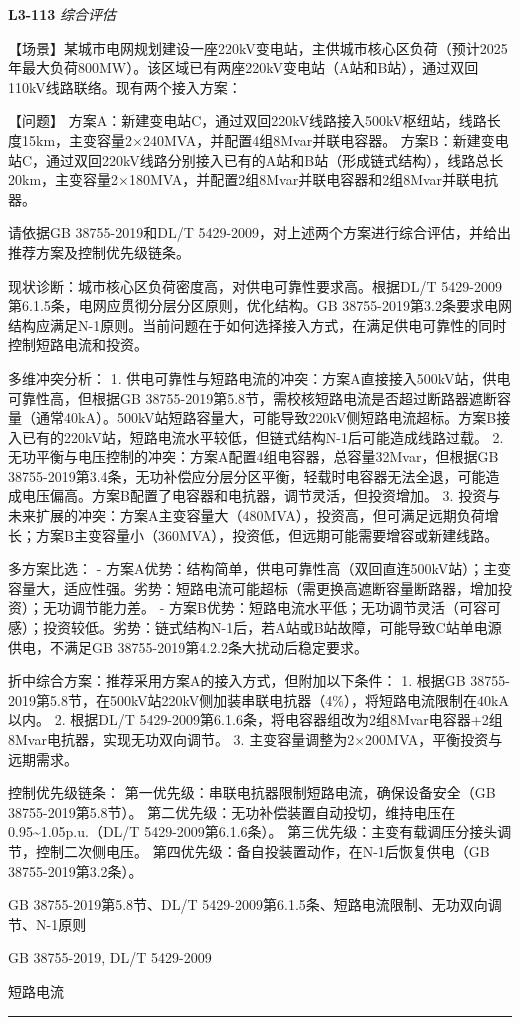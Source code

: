 \documentclass[12pt,a4paper]{ctexart}
\begin{document}
\noindent\textbf{L3-113} \hfill \textit{综合评估}
\begin{description}[leftmargin=1.5em,style=nextline,font=\normalfont]
  \item[Q:] 【场景】某城市电网规划建设一座220kV变电站，主供城市核心区负荷（预计2025年最大负荷800MW）。该区域已有两座220kV变电站（A站和B站），通过双回110kV线路联络。现有两个接入方案：

【问题】
方案A：新建变电站C，通过双回220kV线路接入500kV枢纽站，线路长度15km，主变容量2×240MVA，并配置4组8Mvar并联电容器。
方案B：新建变电站C，通过双回220kV线路分别接入已有的A站和B站（形成链式结构），线路总长20km，主变容量2×180MVA，并配置2组8Mvar并联电容器和2组8Mvar并联电抗器。

请依据GB 38755-2019和DL/T 5429-2009，对上述两个方案进行综合评估，并给出推荐方案及控制优先级链条。
  \item[A:] 现状诊断：城市核心区负荷密度高，对供电可靠性要求高。根据DL/T 5429-2009第6.1.5条，电网应贯彻分层分区原则，优化结构。GB 38755-2019第3.2条要求电网结构应满足N-1原则。当前问题在于如何选择接入方式，在满足供电可靠性的同时控制短路电流和投资。

多维冲突分析：
1. 供电可靠性与短路电流的冲突：方案A直接接入500kV站，供电可靠性高，但根据GB 38755-2019第5.8节，需校核短路电流是否超过断路器遮断容量（通常40kA）。500kV站短路容量大，可能导致220kV侧短路电流超标。方案B接入已有的220kV站，短路电流水平较低，但链式结构N-1后可能造成线路过载。
2. 无功平衡与电压控制的冲突：方案A配置4组电容器，总容量32Mvar，但根据GB 38755-2019第3.4条，无功补偿应分层分区平衡，轻载时电容器无法全退，可能造成电压偏高。方案B配置了电容器和电抗器，调节灵活，但投资增加。
3. 投资与未来扩展的冲突：方案A主变容量大（480MVA），投资高，但可满足远期负荷增长；方案B主变容量小（360MVA），投资低，但远期可能需要增容或新建线路。

多方案比选：
- 方案A优势：结构简单，供电可靠性高（双回直连500kV站）；主变容量大，适应性强。劣势：短路电流可能超标（需更换高遮断容量断路器，增加投资）；无功调节能力差。
- 方案B优势：短路电流水平低；无功调节灵活（可容可感）；投资较低。劣势：链式结构N-1后，若A站或B站故障，可能导致C站单电源供电，不满足GB 38755-2019第4.2.2条大扰动后稳定要求。

折中综合方案：推荐采用方案A的接入方式，但附加以下条件：
1. 根据GB 38755-2019第5.8节，在500kV站220kV侧加装串联电抗器（4\%），将短路电流限制在40kA以内。
2. 根据DL/T 5429-2009第6.1.6条，将电容器组改为2组8Mvar电容器+2组8Mvar电抗器，实现无功双向调节。
3. 主变容量调整为2×200MVA，平衡投资与远期需求。

控制优先级链条：
第一优先级：串联电抗器限制短路电流，确保设备安全（GB 38755-2019第5.8节）。
第二优先级：无功补偿装置自动投切，维持电压在0.95\textasciitilde{}1.05p.u.（DL/T 5429-2009第6.1.6条）。
第三优先级：主变有载调压分接头调节，控制二次侧电压。
第四优先级：备自投装置动作，在N-1后恢复供电（GB 38755-2019第3.2条）。
  \item[KW:] GB 38755-2019第5.8节、DL/T 5429-2009第6.1.5条、短路电流限制、无功双向调节、N-1原则
  \item[Std:] GB 38755-2019, DL/T 5429-2009
  \item[Topic:] 短路电流
\end{description}
\vspace{4pt}
\hrule\vspace{6pt}
\end{document}
